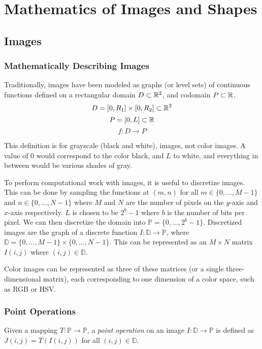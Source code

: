 \chapter{Mathematics of Images and Shapes}
\label{ch:images}

\section{Images}

\subsection{Mathematically Describing Images}

Traditionally, images have been modeled as graphs (or level sets) of continuous functions defined on a rectangular domain $D \subset \mathbb{R}^2$, and codomain $P \subset \mathbb{R}$. \[D = \left[0, R_1\right] \times \left[0, R_2\right] \subset \mathbb{R}^2\] \[P = \left[0, L\right] \subset \mathbb{R}\] \[f : D \to P\]

This definition is for grayscale (black and white), images, not color images. A value of $0$ would correspond to the color black, and $L$ to white, and everything in between would be various shades of gray.

To perform computational work with images, it is useful to discretize images. This can be done by sampling the functions at $(m, n)$ for all $m \in \{0, \ldots, M-1\}$ and $n \in \{0, \ldots, N-1\}$ where $M$ and $N$ are the number of pixels on the $y$-axis and $x$-axis respectively. $L$ is chosen to be $2^b-1$ where $b$ is the number of bits per pixel. We can then discretize the domain into $\mathbb{P} = \{0, \ldots, 2^b-1\}$. Discretized images are the graph of a discrete function $I: \mathbb{D} \to \mathbb{P}$, where $\mathbb{D} = \{0, \ldots, M-1\} \times \{0, \ldots, N-1\}$. This can be represented as an $M \times N$ matrix $I(i, j)$ where $(i, j) \in \mathbb{D}$.

Color images can be represented as three of these matrices (or a single three-dimensional matrix), each corresponding to one dimension of a color space, such as RGB or HSV.

\subsection{Point Operations}

\begin{defn}
    Given a mapping $T: \mathbb{P} \to \mathbb{P}$, a \emph{point operation} on an image $I: \mathbb{D} \to \mathbb{P}$ is defined as $J(i, j) = T(I(i, j))$ for all $(i, j) \in \mathbb{D}$.
\end{defn}

